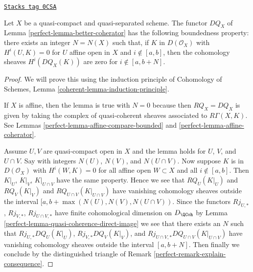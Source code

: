 \begin{lemma}
\label{perfect-lemma-boundedness-better-coherator}
\href{https://stacks.math.columbia.edu/tag/0CSA}{\texttt{Stacks tag 0CSA}}

Let $X$ be a quasi-compact and quasi-separated scheme. The functor
$DQ_X$ of Lemma \ref{perfect-lemma-better-coherator}
has the following boundedness property:
there exists an integer $N = N(X)$ such that, if
$K$ in $D(\mathcal{O}_X)$ with
$H^i(U, K) = 0$ for $U$ affine open in $X$ and $i \not \in [a, b]$, then
the cohomology sheaves $H^i(DQ_X(K))$ are zero for
$i \not \in [a, b + N]$.
\end{lemma}

\begin{proof}

We will prove this using the induction principle of
Cohomology of Schemes, Lemma \ref{coherent-lemma-induction-principle}.

\medskip\noindent
If $X$ is affine, then the lemma is true with $N = 0$ because then
$RQ_X = DQ_X$ is given by taking the complex of
quasi-coherent sheaves associated to $R\Gamma(X, K)$.
See Lemmas \ref{perfect-lemma-affine-compare-bounded} and \ref{perfect-lemma-affine-coherator}.

\medskip\noindent
Assume $U, V$ are quasi-compact open in $X$
and the lemma holds for $U$, $V$, and $U \cap V$.
Say with integers $N(U)$, $N(V)$, and $N(U \cap V)$.
Now suppose $K$ is in $D(\mathcal{O}_X)$ with
$H^i(W, K) = 0$ for all affine open $W \subset X$ and all $i \not \in [a, b]$.
Then $K|_U$, $K|_V$, $K|_{U \cap V}$ have the same property.
Hence we see that $RQ_U(K|_U)$ and $RQ_V(K|_V)$ and
$RQ_{U \cap V}(K|_{U \cap V})$ have vanishing cohomology
sheaves outside the interval $[a, b + \max(N(U), N(V), N(U \cap V))$.
Since the functors $Rj_{U, *}$, $Rj_{V, *}$, $Rj_{U \cap V, *}$
have finite cohomological dimension on $D_\QCoh$ by
Lemma \ref{perfect-lemma-quasi-coherence-direct-image}
we see that there exists an $N$ such that
$Rj_{U, *}DQ_U(K|_U)$, $Rj_{V, *}DQ_V(K|_V)$, and
$Rj_{U \cap V, *}DQ_{U \cap V}(K|_{U \cap V})$ have vanishing
cohomology sheaves outside the interval $[a, b + N]$.
Then finally we conclude by the distinguished triangle
of Remark \ref{perfect-remark-explain-consequence}.
\end{proof}

